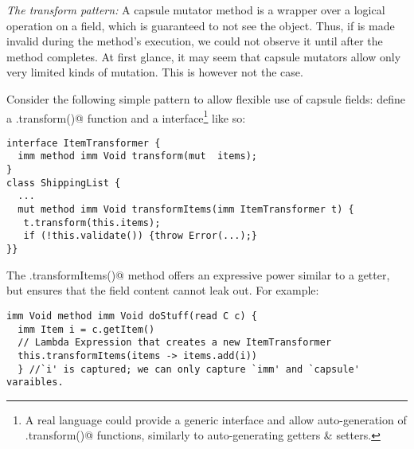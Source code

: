 \loseSpace
\noindent\textit{The transform pattern:}
A capsule mutator method is a wrapper over a logical operation on a field, which is guaranteed to not see the \Q@this@ object.
Thus, if \Q@this@ is made invalid during 
the method's execution, we could not observe it until after the method completes.
At first glance, it may seem that capsule mutators allow only very limited kinds of mutation.
This is however not the case. 

Consider the following
simple pattern to allow flexible use of capsule fields: define a \Q@.transform()@ function and a \Q@ItemTransformer@ interface\footnote{A real language could
provide a generic \Q@Transformer@ interface and allow auto-generation of  \Q@.transform()@ functions, similarly to auto-generating getters \& setters.} like so:


%
%
%
%
%
%
%

\saveSpace
\begin{lstlisting}
interface ItemTransformer { 
  imm method imm Void transform(mut  items);
}
class ShippingList {
  ...
  mut method imm Void transformItems(imm ItemTransformer t) {
   t.transform(this.items);
   if (!this.validate()) {throw Error(...);}
}}
\end{lstlisting}
The \Q@.transformItems()@ method 
offers an expressive power similar to a
\Q@mut@ getter, but ensures that 
the field content cannot leak out.
For example:
\begin{lstlisting}[escapechar=\%]
imm Void method imm Void doStuff(read C c) {
  imm Item i = c.getItem()
  // Lambda Expression that creates a new ItemTransformer
  this.transformItems(items -> items.add(i))
  } //`i' is captured; we can only capture `imm' and `capsule' varaibles.
\end{lstlisting}


